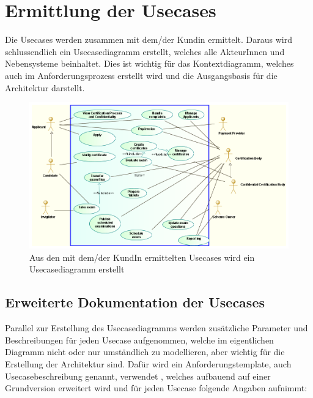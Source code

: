 \section{Ermittlung der Usecases}
Die Usecases werden zusammen mit dem/der Kundin ermittelt. Daraus wird schlussendlich ein Usecasediagramm erstellt, welches alle AkteurInnen und Nebensysteme beinhaltet. Dies ist wichtig für das Kontextdiagramm, welches auch im Anforderungsprozess erstellt wird und die Ausgangsbasis für die Architektur darstellt.

\begin{figure}[!htbp]
    \centering
    \includegraphics[scale=0.4]{uml/usecase.png}
    \caption{Aus den mit dem/der KundIn ermittelten Usecases wird ein Usecasediagramm erstellt}
\end{figure}

\subsection{Erweiterte Dokumentation der Usecases}
Parallel zur Erstellung des Usecasediagramms werden zusätzliche Parameter und Beschreibungen für jeden Usecase aufgenommen, welche im eigentlichen Diagramm nicht oder nur umständlich zu modellieren, aber wichtig für die Erstellung der Architektur sind.
Dafür wird ein Anforderungstemplate, auch Usecasebeschreibung genannt, verwendet \cite[S. 214]{reqman}, welches aufbauend auf einer Grundversion \cite[Abbildung 8.14, S. 215]{reqman} erweitert wird und für jeden Usecase folgende Angaben aufnimmt:

